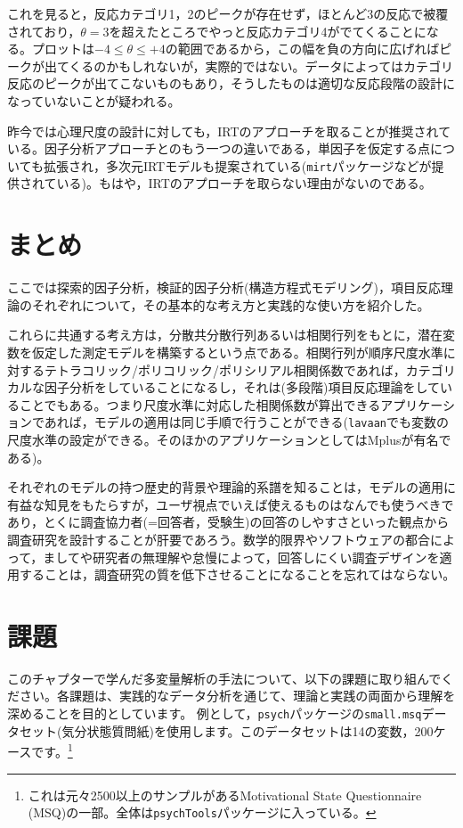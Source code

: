 \documentclass[
  a4paper,
]{ltjsbook}
\begin{document}
これを見ると，反応カテゴリ1，2のピークが存在せず，ほとんど3の反応で被覆されており，\(\theta=3\)を超えたところでやっと反応カテゴリ4がでてくることになる。プロットは\(-4 \le \theta \le +4\)の範囲であるから，この幅を負の方向に広げればピークが出てくるのかもしれないが，実際的ではない。データによってはカテゴリ反応のピークが出てこないものもあり，そうしたものは適切な反応段階の設計になっていないことが疑われる。

昨今では心理尺度の設計に対しても，IRTのアプローチを取ることが推奨されている。因子分析アプローチとのもう一つの違いである，単因子を仮定する点についても拡張され，多次元IRTモデルも提案されている(\texttt{mirt}パッケージなどが提供されている)。もはや，IRTのアプローチを取らない理由がないのである。

\section{まとめ}\label{ux307eux3068ux3081-1}

ここでは探索的因子分析，検証的因子分析(構造方程式モデリング)，項目反応理論のそれぞれについて，その基本的な考え方と実践的な使い方を紹介した。

これらに共通する考え方は，分散共分散行列あるいは相関行列をもとに，潜在変数を仮定した測定モデルを構築するという点である。相関行列が順序尺度水準に対するテトラコリック/ポリコリック/ポリシリアル相関係数であれば，カテゴリカルな因子分析をしていることになるし，それは(多段階)項目反応理論をしていることでもある。つまり尺度水準に対応した相関係数が算出できるアプリケーションであれば，モデルの適用は同じ手順で行うことができる(\texttt{lavaan}でも変数の尺度水準の設定ができる。そのほかのアプリケーションとしてはMplusが有名である)。

それぞれのモデルの持つ歴史的背景や理論的系譜を知ることは，モデルの適用に有益な知見をもたらすが，ユーザ視点でいえば使えるものはなんでも使うべきであり，とくに調査協力者(=回答者，受験生)の回答のしやすさといった観点から調査研究を設計することが肝要であろう。数学的限界やソフトウェアの都合によって，ましてや研究者の無理解や怠慢によって，回答しにくい調査デザインを適用することは，調査研究の質を低下させることになることを忘れてはならない。

\section{課題}\label{ux8ab2ux984c-11}

このチャプターで学んだ多変量解析の手法について、以下の課題に取り組んでください。各課題は、実践的なデータ分析を通じて、理論と実践の両面から理解を深めることを目的としています。
例として，\texttt{psych}パッケージの\texttt{small.msq}データセット(気分状態質問紙)を使用します。このデータセットは14の変数，200ケースです。\footnote{これは元々2500以上のサンプルがあるMotivational
  State Questionnaire
  (MSQ)の一部。全体は\texttt{psychTools}パッケージに入っている。}
\end{document}
